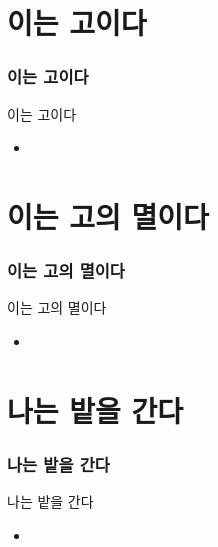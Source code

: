 \documentclass[aspectratio=1610,17pt,xcolor=pdftex,dvipsnames,table,handout]{beamer}
\begin{document}
		\section{				이는 고이다	}
		\begin{frame} [t,plain]					
		\frametitle{			이는 고이다	}
			\begin{block} { 		이는 고이다	}
			\setlength{\leftmargini}{2em}			
			\begin{itemize}
				\item 
			\end{itemize}
			\end{block}						
								
		\end{frame}						

		\section{				이는 고의 멸이다	}
		\begin{frame} [t,plain]					
		\frametitle{			이는 고의 멸이다	}
			\begin{block} { 		이는 고의 멸이다	}
			\setlength{\leftmargini}{2em}			
			\begin{itemize}
				\item 
			\end{itemize}
			\end{block}						
								
		\end{frame}						

		\section{				나는 밭을 간다	}
		\begin{frame} [t,plain]					
		\frametitle{			나는 밭을 간다	}
			\begin{block} { 		나는 밭을 간다	}
			\setlength{\leftmargini}{2em}			
			\begin{itemize}
				\item 
			\end{itemize}
			\end{block}						
								
		\end{frame}						
\end{document}
